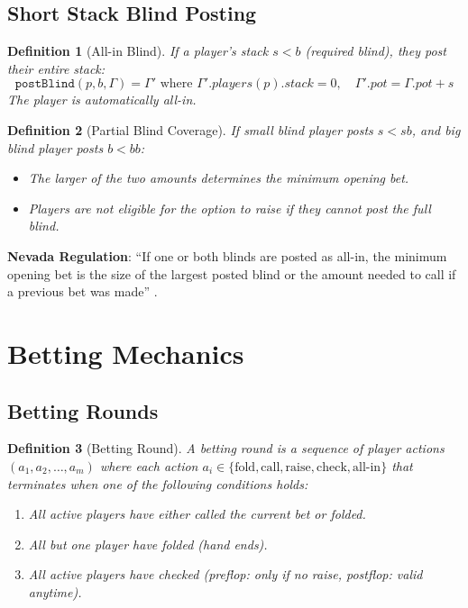 \documentclass[11pt,a4paper]{article}
\newtheorem{definition}{Definition}[section]
\begin{document}
\subsection{Short Stack Blind Posting}

\begin{definition}[All-in Blind]
\label{def:allin-blind}
If a player's stack $s < b$ (required blind), they post their entire stack:
\[
\texttt{postBlind}(p, b, \Gamma) = \Gamma' \text{ where } \Gamma'.players(p).stack = 0, \quad \Gamma'.pot = \Gamma.pot + s
\]
The player is automatically all-in.
\end{definition}

\begin{definition}[Partial Blind Coverage]
\label{def:partial-blind}
If small blind player posts $s < sb$, and big blind player posts $b < bb$:
\begin{itemize}
    \item The larger of the two amounts determines the minimum opening bet.
    \item Players are not eligible for the option to raise if they cannot post the full blind.
\end{itemize}
\end{definition}

\textbf{Nevada Regulation}: ``If one or both blinds are posted as all-in, the minimum opening bet is the size of the largest posted blind or the amount needed to call if a previous bet was made'' \cite{nevada2023gaming}.

\section{Betting Mechanics}
\label{sec:betting}

\subsection{Betting Rounds}

\begin{definition}[Betting Round]
\label{def:betting-round}
A betting round is a sequence of player actions $(a_1, a_2, \ldots, a_m)$ where each action $a_i \in \{\text{fold}, \text{call}, \text{raise}, \text{check}, \text{all-in}\}$ that terminates when one of the following conditions holds:
\begin{enumerate}
    \item All active players have either called the current bet or folded.
    \item All but one player have folded (hand ends).
    \item All active players have checked (preflop: only if no raise, postflop: valid anytime).
\end{enumerate}
\end{definition}
\end{document}
